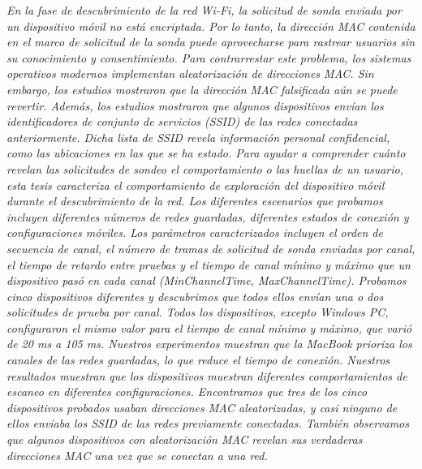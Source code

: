 \emph{En la fase de descubrimiento de la red Wi-Fi, la solicitud de sonda enviada por un dispositivo móvil no está encriptada. Por lo tanto, la dirección MAC contenida en el marco de solicitud de la sonda puede aprovecharse para rastrear usuarios sin su conocimiento y consentimiento. Para contrarrestar este problema, los sistemas operativos modernos implementan aleatorización de direcciones MAC. Sin embargo, los estudios mostraron que la dirección MAC falsificada aún se puede revertir. Además, los estudios mostraron que algunos dispositivos envían los identificadores de conjunto de servicios (SSID) de las redes conectadas anteriormente. Dicha lista de SSID revela información personal confidencial, como las ubicaciones en las que se ha estado. Para ayudar a comprender cuánto revelan las solicitudes de sondeo el comportamiento o las huellas de un usuario, esta tesis caracteriza el comportamiento de exploración del dispositivo móvil durante el descubrimiento de la red. Los diferentes escenarios que probamos incluyen diferentes números de redes guardadas, diferentes estados de conexión y configuraciones móviles. Los parámetros caracterizados incluyen el orden de secuencia de canal, el número de tramas de solicitud de sonda enviadas por canal, el tiempo de retardo entre pruebas y el tiempo de canal mínimo y máximo que un dispositivo pasó en cada canal (MinChannelTime, MaxChannelTime). Probamos cinco dispositivos diferentes y descubrimos que todos ellos envían una o dos solicitudes de prueba por canal. Todos los dispositivos, excepto Windows PC, configuraron el mismo valor para el tiempo de canal mínimo y máximo, que varió de 20 ms a 105 ms. Nuestros experimentos muestran que la MacBook prioriza los canales de las redes guardadas, lo que reduce el tiempo de conexión. Nuestros resultados muestran que los dispositivos muestran diferentes comportamientos de escaneo en diferentes configuraciones. Encontramos que tres de los cinco dispositivos probados usaban direcciones MAC aleatorizadas, y casi ninguno de ellos enviaba los SSID de las redes previamente conectadas. También observamos que algunos dispositivos con aleatorización MAC revelan sus verdaderas direcciones MAC una vez que se conectan a una red.}\\

